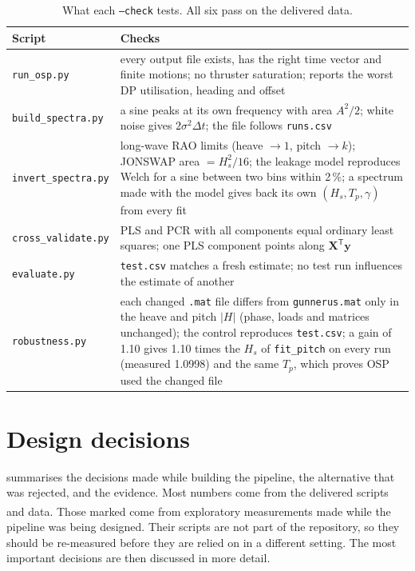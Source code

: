 \documentclass[11pt,a4paper]{article}
\newcommand{\Hs}{H_{s}}
\newcommand{\Tp}{T_{p}}
\newcommand{\dagnote}{\textsuperscript{\dag}}
\newcommand{\vect}[1]{\boldsymbol{#1}}
\begin{document}
\begin{table}[htbp]
  \centering
  \caption{What each \texttt{--check} tests. All six pass on the delivered data.}
  \label{tab:checks}
  \small
  \begin{tabular}{@{}p{3.3cm}p{11.7cm}@{}}
    \toprule
    Script & Checks \\
    \midrule
    \texttt{run\_osp.py} & every output file exists, has the right time vector and finite
      motions; no thruster saturation; reports the worst DP utilisation, heading and offset \\
    \texttt{build\_spectra.py} & a sine peaks at its own frequency with area $A^2/2$; white
      noise gives $2\sigma^2\Delta t$; the file follows \texttt{runs.csv} \\
    \texttt{invert\_spectra.py} & long-wave RAO limits (heave $\to 1$, pitch $\to k$); JONSWAP
      area $= \Hs^2/16$; the leakage model reproduces Welch for a sine between two bins within
      2\,\%; a spectrum made with the model gives back its own $(\Hs,\Tp,\gamma)$ from every fit \\
    \texttt{cross\_validate.py} & PLS and PCR with all components equal ordinary least squares;
      one PLS component points along $\vect X^{\mathsf T}\vect y$ \\
    \texttt{evaluate.py} & \texttt{test.csv} matches a fresh estimate; no test run influences the
      estimate of another \\
    \texttt{robustness.py} & each changed \texttt{.mat} file differs from \texttt{gunnerus.mat}
      only in the heave and pitch $|H|$ (phase, loads and matrices unchanged); the control
      reproduces \texttt{test.csv}; a gain of 1.10 gives 1.10 times the $\Hs$ of
      \texttt{fit\_pitch} on every run (measured 1.0998) and the same $\Tp$, which proves OSP
      used the changed file \\
    \bottomrule
  \end{tabular}
\end{table}

\section{Design decisions}
\label{sec:decisions}

 summarises the decisions made while building the pipeline, the alternative
that was rejected, and the evidence. Most numbers come from the delivered scripts and data.
Those marked \dagnote{} come from exploratory measurements made while the pipeline was being
designed. Their scripts are not part of the repository, so they should be re-measured
before they are relied on in a different setting. The most important decisions are then
discussed in more detail.
\end{document}
